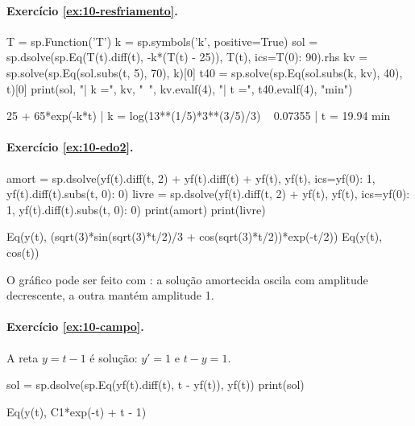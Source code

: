 \paragraph{Exercício \ref{ex:10-resfriamento}.}
\begin{entrada}
T = sp.Function('T')
k = sp.symbols('k', positive=True)
sol = sp.dsolve(sp.Eq(T(t).diff(t), -k*(T(t) - 25)), T(t), ics={T(0): 90}).rhs
kv = sp.solve(sp.Eq(sol.subs(t, 5), 70), k)[0]
t40 = sp.solve(sp.Eq(sol.subs(k, kv), 40), t)[0]
print(sol, "|  k =", kv, "~", kv.evalf(4), "|  t =", t40.evalf(4), "min")
\end{entrada}
\begin{saida}
25 + 65*exp(-k*t) |  k = log(13**(1/5)*3**(3/5)/3) ~ 0.07355 |  t = 19.94 min
\end{saida}

\paragraph{Exercício \ref{ex:10-edo2}.}
\begin{entrada}
amort = sp.dsolve(yf(t).diff(t, 2) + yf(t).diff(t) + yf(t), yf(t), ics={yf(0): 1, yf(t).diff(t).subs(t, 0): 0})
livre = sp.dsolve(yf(t).diff(t, 2) + yf(t), yf(t), ics={yf(0): 1, yf(t).diff(t).subs(t, 0): 0})
print(amort)
print(livre)
\end{entrada}
\begin{saida}
Eq(y(t), (sqrt(3)*sin(sqrt(3)*t/2)/3 + cos(sqrt(3)*t/2))*exp(-t/2))
Eq(y(t), cos(t))
\end{saida}

O gráfico pode ser feito com : a solução amortecida oscila com
amplitude decrescente, a outra mantém amplitude 1.

\paragraph{Exercício \ref{ex:10-campo}.} A reta $y=t-1$ é solução: $y'=1$ e $t-y=1$.
\begin{entrada}
sol = sp.dsolve(sp.Eq(yf(t).diff(t), t - yf(t)), yf(t))
print(sol)
\end{entrada}
\begin{saida}
Eq(y(t), C1*exp(-t) + t - 1)
\end{saida}
